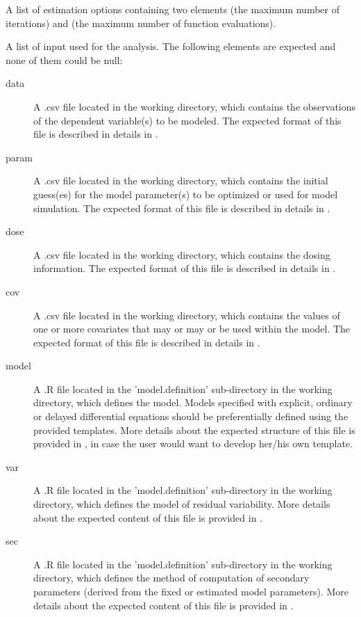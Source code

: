 \begin{Arguments}
\begin{ldescription}
\begin{description}
\end{description}


\item[\code{estim.options}] A list of estimation options containing two elements
 (the maximum number of iterations) and  (the
maximum number of function evaluations).

\item[\code{files}] A list of input used for the analysis. The following elements are
expected and none of them could be null: \begin{description}

\item[data] A .csv file located in the working directory, which contains
the observations of the dependent variable(s) to be modeled. The
expected format of this file is described in details in
.
\item[param] A .csv file located in the working directory, which contains
the initial guess(es) for the model parameter(s) to be optimized or used
for model simulation. The expected format of this file is described in
details in .
\item[dose] A .csv file located in the working directory, which contains
the dosing information. The expected format of this file is described in
details in .
\item[cov] A .csv file located in the working directory, which contains
the values of one or more covariates that may or may or be used within
the model. The expected format of this file is described in details in
.
\item[model] A .R file located in the 'model.definition'
sub-directory in the working directory, which defines the model. Models
specified with explicit, ordinary or delayed differential equations
should be preferentially defined using the provided templates. More
details about the expected structure of this file is provided in
, in case the user would
want to develop her/his own template.
\item[var] A .R file located in the 'model.definition' sub-directory
in the working directory, which defines the model of residual
variability. More details about the expected content of this file is
provided in .
\item[sec] A .R file located in the 'model.definition' sub-directory
in the working directory, which defines the method of computation of
secondary parameters (derived from the fixed or estimated model
parameters). More details about the expected content of this file is
provided in .

\end{description}


\end{ldescription}
\end{Arguments}
